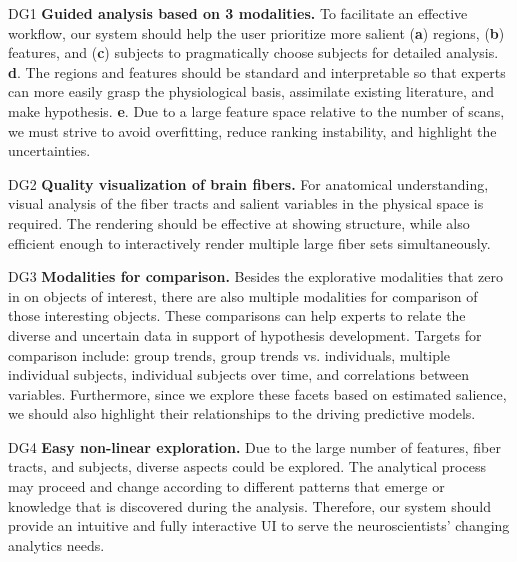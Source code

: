 \begin{asparadesc}

    \item[DG1] \textbf{Guided analysis based on 3 modalities.}
   To facilitate an effective workflow, our system should help the user prioritize more salient (\textbf{a}) regions, (\textbf{b}) features, and (\textbf{c}) subjects to pragmatically choose subjects for detailed analysis. \textbf{d}. The regions and features should be standard and interpretable so that experts can more easily grasp the physiological basis, assimilate existing literature, and make hypothesis. \textbf{e}. Due to a large feature space relative to the number of scans, we must strive to avoid overfitting, reduce ranking instability, and highlight the uncertainties.
    

	\item[DG2] \textbf{Quality visualization of brain fibers.}
	For anatomical understanding, visual analysis of the fiber tracts and salient variables in the physical space is required. The rendering should be effective at showing structure, while also efficient enough to interactively render multiple large fiber sets simultaneously.
	
	\item[DG3] \textbf{Modalities for comparison.} Besides the explorative modalities that zero in on objects of interest, there are also multiple modalities for comparison of those interesting objects. These comparisons can help experts to relate the diverse and uncertain data in support of hypothesis development. 
	Targets for comparison include: group trends, group trends vs. individuals, multiple individual subjects, individual subjects over time, and correlations between variables. Furthermore, since we explore these facets based on estimated salience, we should also highlight their relationships to the driving predictive models. 

    \item[DG4] \textbf{Easy non-linear exploration.}
    Due to the large number of features, fiber tracts, and subjects, 
    diverse aspects could be explored. 
    The analytical process may proceed and change according to different patterns that emerge or knowledge that is discovered during the analysis. 
    Therefore, our system should provide an intuitive and fully interactive UI to serve the neuroscientists' changing analytics needs.

\end{asparadesc}

